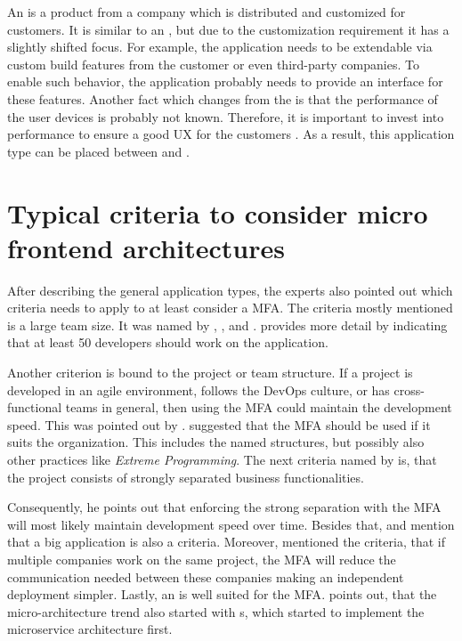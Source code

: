 An  is a product from a company which is distributed and customized for customers.
It is similar to an , but due to the customization requirement it has a slightly shifted focus.
For example, the application needs to be extendable via custom build features from the customer or even third-party companies.
To enable such behavior, the application probably needs to provide an interface for these features.
Another fact which changes from the  is that the performance of the user devices is probably not known.
Therefore, it is important to invest into performance to ensure a good \ac{UX} for the customers \cite{Grijzen.2019}.
As a result, this application type can be placed between  and .





\section{Typical criteria to consider micro frontend architectures}\label{cha:scenarios_criteria}

After describing the general application types, the experts also pointed out which criteria needs to apply to at least consider a \ac{MFA}.
The criteria mostly mentioned is a large team size.
It was named by \textciteRehm{}, \textciteOlleck{}, \textciteJovanovic{} and \textciteMezzalira{}.
\citeauthorMezzalira{} provides more detail by indicating that at least 50 developers should work on the application.

Another criterion is bound to the project or team structure.
If a project is developed in an agile environment, follows the DevOps culture, or has cross-functional teams in general, then using the \ac{MFA} could maintain the development speed.
This was pointed out by \textciteRehm{}.
\textciteJovanovic{} suggested that the \ac{MFA} should be used if it suits the organization.
This includes the named structures, but possibly also other practices like \textit{Extreme Programming}.
The next criteria named by \textciteOlleck{} is, that the project consists of strongly separated business functionalities.

Consequently, he points out that enforcing the strong separation with the \ac{MFA} will most likely maintain development speed over time.
Besides that, \textciteOlleck{} and \textciteJovanovic{} mention that a big application is also a criteria.
Moreover, \citeauthorOlleck{} mentioned the criteria, that if multiple companies work on the same project, the \ac{MFA} will reduce the communication needed between these companies making an independent deployment simpler.
Lastly, an  is well suited for the \ac{MFA}.
\textciteSteyer{} points out, that the micro-architecture trend also started with s, which started to implement the microservice architecture first.

